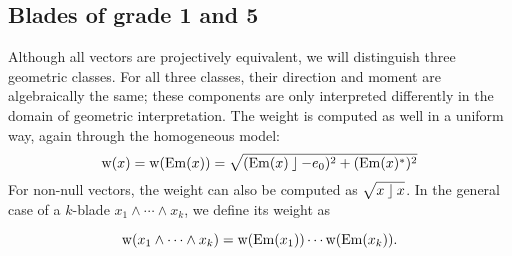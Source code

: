 \subsection{Blades of grade 1 and 5}
Although all vectors are projectively equivalent, we will distinguish three geometric classes.  For all three classes, their direction and moment are algebraically the same; these components are only interpreted differently in the domain of geometric interpretation.  The weight is computed as well in a uniform way, again through the homogeneous model:
\begin{equation*}
  \operatorname{w}(x) = 
      \operatorname{w}(\operatorname{Em}(x)) = \sqrt{(\operatorname{Em}(x) \mathbin{\rfloor} -e_0)^2 + (\operatorname{Em}(x)^\ast)^2} 
\end{equation*}
For non-null vectors, the weight can also be computed as $\sqrt{x \mathbin{\rfloor} x}$.  In the general case of a $k$-blade $x_1 \wedge \cdots \wedge x_k$, we define its weight as 

\begin{equation*}
  \operatorname{w}(x_1 \wedge \cdots \wedge x_k) = \operatorname{w}(\operatorname{Em}(x_1)) \cdots \operatorname{w}(\operatorname{Em}(x_k)) .
\end{equation*}

